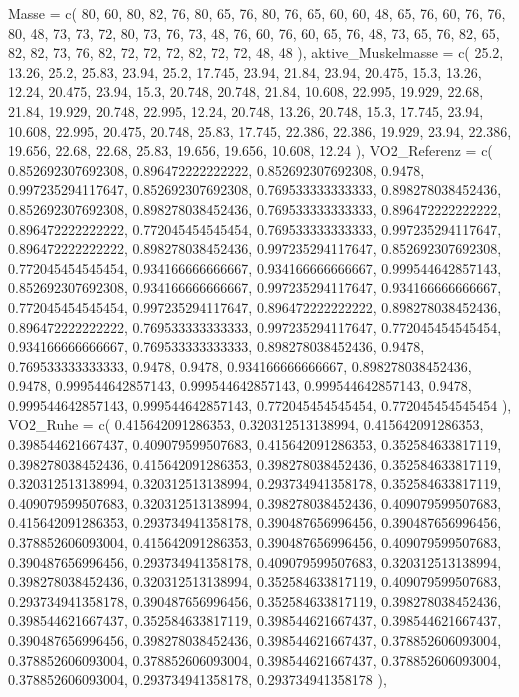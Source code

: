 \documentclass[
  letterpaper,
  DIV=11]{scrartcl}
\newenvironment{Shaded}{\begin{snugshade}}{\end{snugshade}}
\newcommand{\NormalTok}[1]{\textcolor[rgb]{0.00,0.23,0.31}{#1}}
\begin{document}
\begin{Shaded}
\begin{Highlighting}[]
\NormalTok{  \textasciigrave{}Masse\textasciigrave{} = c( 80, 60, 80, 82, 76, 80, 65, 76, 80, 76, 65, 60, 60, 48, 65, 76, 60, 76, 76, 80, 48, 73, 73, 72, 80, 73, 76, 73, 48, 76, 60, 76, 60, 65, 76, 48, 73, 65, 76, 82, 65, 82, 82, 73, 76, 82, 72, 72, 72, 82, 72, 72, 48, 48 ),}
\NormalTok{  \textasciigrave{}aktive\_Muskelmasse\textasciigrave{} = c( 25.2, 13.26, 25.2, 25.83, 23.94, 25.2, 17.745, 23.94, 21.84, 23.94, 20.475, 15.3, 13.26, 12.24, 20.475, 23.94, 15.3, 20.748, 20.748, 21.84, 10.608, 22.995, 19.929, 22.68, 21.84, 19.929, 20.748, 22.995, 12.24, 20.748, 13.26, 20.748, 15.3, 17.745, 23.94, 10.608, 22.995, 20.475, 20.748, 25.83, 17.745, 22.386, 22.386, 19.929, 23.94, 22.386, 19.656, 22.68, 22.68, 25.83, 19.656, 19.656, 10.608, 12.24 ),}
\NormalTok{  \textasciigrave{}VO2\_Referenz\textasciigrave{} = c( 0.852692307692308, 0.896472222222222, 0.852692307692308, 0.9478, 0.997235294117647, 0.852692307692308, 0.769533333333333, 0.898278038452436, 0.852692307692308, 0.898278038452436, 0.769533333333333, 0.896472222222222, 0.896472222222222, 0.772045454545454, 0.769533333333333, 0.997235294117647, 0.896472222222222, 0.898278038452436, 0.997235294117647, 0.852692307692308, 0.772045454545454, 0.934166666666667, 0.934166666666667, 0.999544642857143, 0.852692307692308, 0.934166666666667, 0.997235294117647, 0.934166666666667, 0.772045454545454, 0.997235294117647, 0.896472222222222, 0.898278038452436, 0.896472222222222, 0.769533333333333, 0.997235294117647, 0.772045454545454, 0.934166666666667, 0.769533333333333, 0.898278038452436, 0.9478, 0.769533333333333, 0.9478, 0.9478, 0.934166666666667, 0.898278038452436, 0.9478, 0.999544642857143, 0.999544642857143, 0.999544642857143, 0.9478, 0.999544642857143, 0.999544642857143, 0.772045454545454, 0.772045454545454 ),}
\NormalTok{  \textasciigrave{}VO2\_Ruhe\textasciigrave{} = c( 0.415642091286353, 0.320312513138994, 0.415642091286353, 0.398544621667437, 0.409079599507683, 0.415642091286353, 0.352584633817119, 0.398278038452436, 0.415642091286353, 0.398278038452436, 0.352584633817119, 0.320312513138994, 0.320312513138994, 0.293734941358178, 0.352584633817119, 0.409079599507683, 0.320312513138994, 0.398278038452436, 0.409079599507683, 0.415642091286353, 0.293734941358178, 0.390487656996456, 0.390487656996456, 0.378852606093004, 0.415642091286353, 0.390487656996456, 0.409079599507683, 0.390487656996456, 0.293734941358178, 0.409079599507683, 0.320312513138994, 0.398278038452436, 0.320312513138994, 0.352584633817119, 0.409079599507683, 0.293734941358178, 0.390487656996456, 0.352584633817119, 0.398278038452436, 0.398544621667437, 0.352584633817119, 0.398544621667437, 0.398544621667437, 0.390487656996456, 0.398278038452436, 0.398544621667437, 0.378852606093004, 0.378852606093004, 0.378852606093004, 0.398544621667437, 0.378852606093004, 0.378852606093004, 0.293734941358178, 0.293734941358178 ),}

\end{Highlighting}
\end{Shaded}
\end{document}
